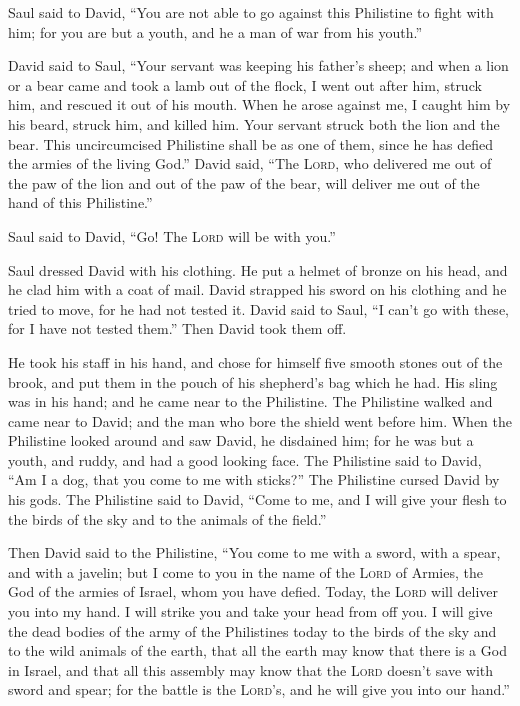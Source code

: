  Saul said to David, ``You are not able to go against
this Philistine to fight with him; for you are but a youth, and he a man
of war from his youth.''

 David said to Saul, ``Your servant was keeping his
father's sheep; and when a lion or a bear came and took a lamb out of
the flock,  I went out after him, struck him, and rescued
it out of his mouth. When he arose against me, I caught him by his
beard, struck him, and killed him.  Your servant struck
both the lion and the bear. This uncircumcised Philistine shall be as
one of them, since he has defied the armies of the living God.''
 David said, ``The \textsc{Lord}, who delivered me out of
the paw of the lion and out of the paw of the bear, will deliver me out
of the hand of this Philistine.''

Saul said to David, ``Go! The \textsc{Lord} will be with you.''

 Saul dressed David with his clothing. He put a helmet of
bronze on his head, and he clad him with a coat of mail. 
David strapped his sword on his clothing and he tried to move, for he
had not tested it. David said to Saul, ``I can't go with these, for I
have not tested them.'' Then David took them off.

 He took his staff in his hand, and chose for himself
five smooth stones out of the brook, and put them in the pouch of his
shepherd's bag which he had. His sling was in his hand; and he came near
to the Philistine.  The Philistine walked and came near
to David; and the man who bore the shield went before him.
 When the Philistine looked around and saw David, he
disdained him; for he was but a youth, and ruddy, and had a good looking
face.  The Philistine said to David, ``Am I a dog, that
you come to me with sticks?'' The Philistine cursed David by his gods.
 The Philistine said to David, ``Come to me, and I will
give your flesh to the birds of the sky and to the animals of the
field.''

 Then David said to the Philistine, ``You come to me with
a sword, with a spear, and with a javelin; but I come to you in the name
of the \textsc{Lord} of Armies, the God of the armies of Israel, whom
you have defied.  Today, the \textsc{Lord} will deliver
you into my hand. I will strike you and take your head from off you. I
will give the dead bodies of the army of the Philistines today to the
birds of the sky and to the wild animals of the earth, that all the
earth may know that there is a God in Israel,  and that
all this assembly may know that the \textsc{Lord} doesn't save with
sword and spear; for the battle is the \textsc{Lord}'s, and he will give
you into our hand.''

